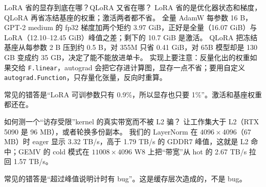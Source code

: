 \documentclass[11pt,a4paper]{ctexart}
\begin{document}
\begin{iqbox}{LoRA 省的显存到底在哪？QLoRA 又省在哪？}
LoRA 省的是优化器状态和梯度，QLoRA 再省冻结基座的权重；激活两者都不省。
全量 AdamW 每参数 16 B，GPT-2 medium 的 fp32 梯度加两个矩约 3.97 GiB，正好是全量（16.07 GiB）与 LoRA（12.10--12.45 GiB）峰值之差；剩下的 10.7 GiB 是激活。
QLoRA 把冻结基座从每参数 2 B 压到约 0.5 B，对 355M 只省 0.41 GiB，对 65B 模型却是 130 GB 变成约 35 GB，决定了能不能放进单卡。
实现上要注意：反量化出的权重如果交给 \texttt{F.linear}，autograd 会把它存进计算图，显存一点不省；要用自定义 \texttt{autograd.Function}，只存量化张量，反向时重算。

常见的错答是“LoRA 可训参数只有 0.9\%，所以显存也只要 1\%”。激活和基座权重都还在。
\end{iqbox}

\begin{iqbox}{如何测一个“访存受限”kernel 的真实带宽而不被 L2 骗？}
让工作集大于 L2（RTX 5090 是 96 MB），或者轮换多份副本。
我们的 LayerNorm 在 $4096\times4096$（67 MB）时 eager 显示 3.32 TB/s，高于 1.79 TB/s 的 GDDR7 峰值，这就是 L2 命中；GEMV 的 cold 模式在 $11008\times4096$ W8 上把“带宽”从 hot 的 2.67 TB/s 拉回 1.57 TB/s。

常见的错答是“超过峰值说明计时有 bug”。这是缓存层次造成的，不是 bug。
\end{iqbox}
\end{document}
